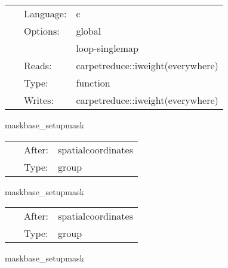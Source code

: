 \hspace{5mm}

 \begin{tabular*}{160mm}{cll} 
~ & Language:  & c \\ 
~ & Options:  & global \\ 
~& ~ &loop-singlemap\\ 
~ & Reads:  & carpetreduce::iweight(everywhere) \\ 
~ & Type:  & function \\ 
~ & Writes:  & carpetreduce::iweight(everywhere) \\ 
\end{tabular*} 


\vspace{5mm}


\hspace{5mm} maskbase\_setupmask 

\hspace{5mm}{\it set up the weight function } 


\hspace{5mm}

 \begin{tabular*}{160mm}{cll} 
~ & After:  & spatialcoordinates \\ 
~ & Type:  & group \\ 
\end{tabular*} 


\vspace{5mm}


\hspace{5mm} maskbase\_setupmask 

\hspace{5mm}{\it set up the weight function } 


\hspace{5mm}

 \begin{tabular*}{160mm}{cll} 
~ & After:  & spatialcoordinates \\ 
~ & Type:  & group \\ 
\end{tabular*} 


\vspace{5mm}


\hspace{5mm} maskbase\_setupmask 

